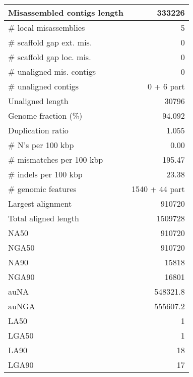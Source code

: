 \documentclass[12pt,a4paper]{article}
\begin{document}
\begin{table}[ht]
\begin{center}
\begin{tabular}{|l*{1}{|r}|}
Misassembled contigs length & 333226 \\ \hline
\# local misassemblies & 5 \\ \hline
\# scaffold gap ext. mis. & 0 \\ \hline
\# scaffold gap loc. mis. & 0 \\ \hline
\# unaligned mis. contigs & 0 \\ \hline
\# unaligned contigs & 0 + 6 part \\ \hline
Unaligned length & 30796 \\ \hline
Genome fraction (\%) & 94.092 \\ \hline
Duplication ratio & 1.055 \\ \hline
\# N's per 100 kbp & 0.00 \\ \hline
\# mismatches per 100 kbp & 195.47 \\ \hline
\# indels per 100 kbp & 23.38 \\ \hline
\# genomic features & 1540 + 44 part \\ \hline
Largest alignment & 910720 \\ \hline
Total aligned length & 1509728 \\ \hline
NA50 & 910720 \\ \hline
NGA50 & 910720 \\ \hline
NA90 & 15818 \\ \hline
NGA90 & 16801 \\ \hline
auNA & 548321.8 \\ \hline
auNGA & 555607.2 \\ \hline
LA50 & 1 \\ \hline
LGA50 & 1 \\ \hline
LA90 & 18 \\ \hline
LGA90 & 17 \\ \hline
\end{tabular}
\end{center}
\end{table}
\end{document}
